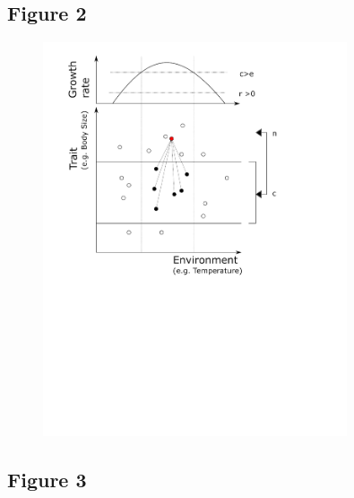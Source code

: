 \documentclass[12pt]{article}
\begin{document}
\newpage

\subsection*{Figure 2}

\begin{figure}[ht!]
	\centering\includegraphics[width=0.8\textwidth]{niche}
\end{figure}

\newpage

\subsection*{Figure 3}
\end{document}
